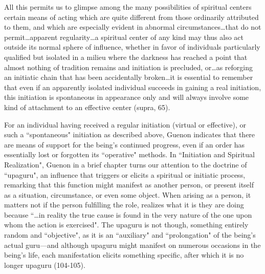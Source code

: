 \begin{quotex}
All this permits us to glimpse among the many possibilities of spiritual centers certain means of acting which are quite different from those ordinarily attributed to them, and which are especially evident in abnormal circumstances…that do not permit…apparent regularity…a spiritual center of any kind may thus also act outside its normal sphere of influence, whether in favor of individuals particularly qualified but isolated in a milieu where the darkness has reached a point that almost nothing of tradition remains and initiation is precluded, or…as reforging an initiatic chain that has been accidentally broken…it is essential to remember that even if an apparently isolated individual succeeds in gaining a real initiation, this initiation is spontaneous in appearance only and will always involve some kind of attachment to an effective center (supra, 65). 

\end{quotex}
For an individual having received a regular initiation (virtual or effective), or such a ``spontaneous" initiation as described above, Guenon indicates that there are means of support for the being's continued progress, even if an order has essentially lost or forgotten its ``operative" methods. In ``Initiation and Spiritual Realization", Guenon in a brief chapter turns our attention to the doctrine of ``upaguru", an influence that triggers or elicits a spiritual or initiatic process, remarking that this function might manifest as another person, or present itself as a situation, circumstance, or even some object. When arising as a person, it matters not if the person fulfilling the role, realizes what it is they are doing because ``…in reality the true cause is found in the very nature of the one upon whom the action is exercised". The upaguru is not though, something entirely random and ``objective", as it is an ``auxiliary" and ``prolongation" of the being's actual guru—and although upaguru might manifest on numerous occasions in the being's life, each manifestation elicits something specific, after which it is no longer upaguru (104-105).

